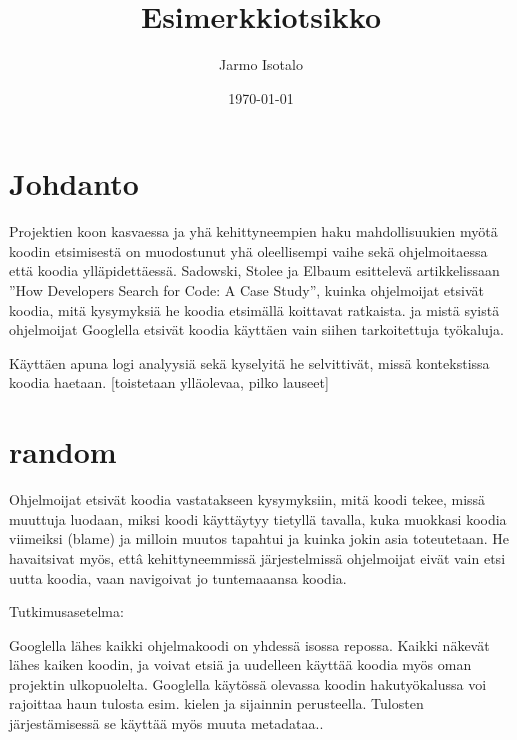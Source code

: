 \documentclass[finnish]{../tktltiki2}
\title{Esimerkkiotsikko}
\author{Jarmo Isotalo}
\date{\today}
\theoremstyle{definition}
\theoremstyle{remark}
\begin{document}

\frontmatter      %

\maketitle        %
\makeabstract     %

\tableofcontents  %


\mainmatter       %

\section{Johdanto}

Projektien koon kasvaessa ja yhä kehittyneempien haku mahdollisuukien myötä koodin etsimisestä on muodostunut yhä oleellisempi vaihe sekä ohjelmoitaessa että koodia ylläpidettäessä. Sadowski, Stolee ja Elbaum esittelevä artikkelissaan ''How Developers Search for Code: A Case Study'', kuinka ohjelmoijat etsivät koodia, mitä kysymyksiä he koodia etsimällä koittavat ratkaista. ja mistä syistä ohjelmoijat Googlella etsivät koodia käyttäen vain siihen tarkoitettuja työkaluja.

Käyttäen apuna logi analyysiä sekä kyselyitä he selvittivät, missä kontekstissa koodia haetaan. [toistetaan ylläolevaa, pilko lauseet]

\section{random}

Ohjelmoijat etsivät koodia vastatakseen kysymyksiin, mitä koodi tekee, missä muuttuja luodaan, miksi koodi käyttäytyy tietyllä tavalla, kuka muokkasi koodia viimeiksi (blame) ja milloin muutos tapahtui ja kuinka jokin asia toteutetaan.
He havaitsivat myös, ettâ kehittyneemmissä järjestelmissä ohjelmoijat eivät vain etsi uutta koodia, vaan navigoivat jo tuntemaaansa koodia.

Tutkimusasetelma:

Googlella lähes kaikki ohjelmakoodi on yhdessä isossa repossa. Kaikki näkevät lähes kaiken koodin, ja voivat etsiä ja uudelleen käyttää koodia myös oman projektin ulkopuolelta. Googlella käytössä olevassa koodin hakutyökalussa voi rajoittaa haun tulosta esim. kielen ja sijainnin perusteella. Tulosten järjestämisessä se käyttää myös muuta metadataa..
\end{document}
